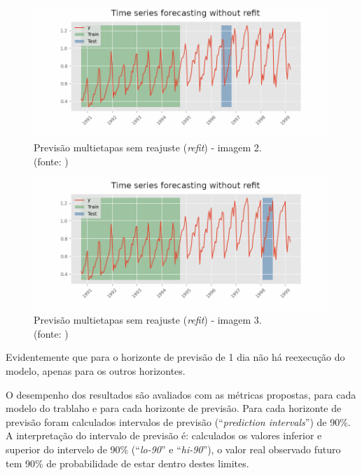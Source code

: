 \begin{figure}[!h]
	\centering
	\includegraphics[scale=0.3]{Figuras/imagem2_skforecast-backtesting-no-refit.png}
	\caption{Previsão multietapas sem reajuste (\textit{refit}) - imagem 2.\\(fonte: \cite{skforecast})}
	\label{fig:imagem2_skforecast-backtesting-no-refit}
\end{figure}

\begin{figure}[!h]
	\centering
	\includegraphics[scale=0.3]{Figuras/imagem3_skforecast-backtesting-no-refit.png}
	\caption{Previsão multietapas sem reajuste (\textit{refit}) - imagem 3.\\(fonte: \cite{skforecast})}
	\label{fig:imagem3_skforecast-backtesting-no-refit}
\end{figure}

Evidentemente que para o horizonte de previsão de 1 dia não há reexecução do modelo, apenas para os outros horizontes.

O desempenho dos resultados são avaliados com as métricas propostas, para cada modelo do trablaho e para cada horizonte de previsão. Para cada horizonte de previsão foram calculados intervalos de previsão (``\textit{prediction intervals}'') de 90\%. A interpretação do intervalo de previsão é: calculados os valores inferior e superior do intervelo de 90\% (``\textit{lo-90}'' e ``\textit{hi-90}''), o valor real observado futuro tem 90\% de probabilidade de estar dentro destes limites.\cite{hyndman_fpp3_2024a}


